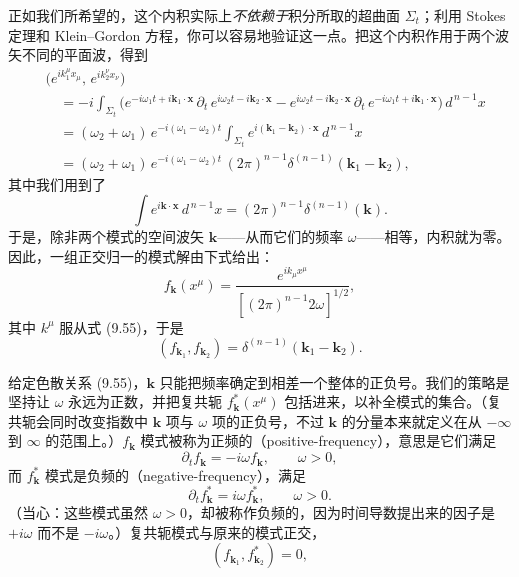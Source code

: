 正如我们所希望的，这个内积实际上\emph{不依赖于}积分所取的超曲面 $\Sigma_t$；利用 Stokes 定理和 Klein–Gordon 方程，你可以容易地验证这一点。把这个内积作用于两个波矢不同的平面波，得到
\begin{align*}
&\bigl(e^{ik_1^\mu x_\mu},\, e^{ik_2^\nu x_\nu}\bigr) \\
&\quad = -i\int_{\Sigma_t}\bigl(e^{-i\omega_1 t + i\mathbf{k}_1\cdot\mathbf{x}}\,\partial_t\, e^{i\omega_2 t - i\mathbf{k}_2\cdot\mathbf{x}} - e^{i\omega_2 t - i\mathbf{k}_2\cdot\mathbf{x}}\,\partial_t\, e^{-i\omega_1 t + i\mathbf{k}_1\cdot\mathbf{x}}\bigr)\, d^{\,n-1}x \\
&\quad = (\omega_2 + \omega_1)\, e^{-i(\omega_1 - \omega_2)t}\int_{\Sigma_t} e^{i(\mathbf{k}_1 - \mathbf{k}_2)\cdot\mathbf{x}}\, d^{\,n-1}x \\
&\quad = (\omega_2 + \omega_1)\, e^{-i(\omega_1 - \omega_2)t}\,(2\pi)^{n-1}\delta^{(n-1)}(\mathbf{k}_1 - \mathbf{k}_2),
\tag{9.57}
\end{align*}
其中我们用到了
\begin{equation*}
\int e^{i\mathbf{k}\cdot\mathbf{x}}\, d^{\,n-1}x = (2\pi)^{n-1}\delta^{(n-1)}(\mathbf{k}).
\tag{9.58}
\end{equation*}
于是，除非两个模式的空间波矢 $\mathbf{k}$——从而它们的频率 $\omega$——相等，内积就为零。因此，一组正交归一的模式解由下式给出：
\begin{equation*}
f_{\mathbf{k}}(x^{\mu}) = \frac{e^{ik_\mu x^\mu}}{\left[(2\pi)^{n-1}2\omega\right]^{1/2}},
\tag{9.59}
\end{equation*}
其中 $k^{\mu}$ 服从式 (9.55)，于是
\begin{equation*}
(f_{\mathbf{k}_1}, f_{\mathbf{k}_2}) = \delta^{(n-1)}(\mathbf{k}_1 - \mathbf{k}_2).
\tag{9.60}
\end{equation*}

给定色散关系 (9.55)，$\mathbf{k}$ 只能把频率确定到相差一个整体的正负号。我们的策略是坚持让 $\omega$ 永远为正数，并把复共轭 $f^{*}_{\mathbf{k}}(x^{\mu})$ 包括进来，以补全模式的集合。（复共轭会同时改变指数中 $\mathbf{k}$ 项与 $\omega$ 项的正负号，不过 $\mathbf{k}$ 的分量本来就定义在从 $-\infty$ 到 $\infty$ 的范围上。）$f_{\mathbf{k}}$ 模式被称为正频的（positive-frequency），意思是它们满足
\begin{equation*}
\partial_t f_{\mathbf{k}} = -i\omega f_{\mathbf{k}}, \qquad \omega > 0,
\tag{9.61}
\end{equation*}
而 $f^{*}_{\mathbf{k}}$ 模式是负频的（negative-frequency），满足
\begin{equation*}
\partial_t f^{*}_{\mathbf{k}} = i\omega f^{*}_{\mathbf{k}}, \qquad \omega > 0.
\tag{9.62}
\end{equation*}
（当心：这些模式虽然 $\omega > 0$，却被称作负频的，因为时间导数提出来的因子是 $+i\omega$ 而不是 $-i\omega$。）复共轭模式与原来的模式正交，
\begin{equation*}
(f_{\mathbf{k}_1}, f^{*}_{\mathbf{k}_2}) = 0,
\tag{9.63}
\end{equation*}
